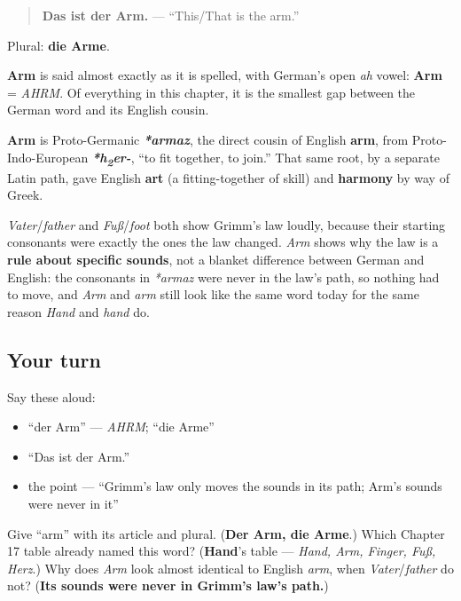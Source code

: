 \begin{quote}
\textbf{Das ist der Arm.} — \textquotedblleft{}This/That is the arm.\textquotedblright{}
\end{quote}

Plural: \textbf{die Arme}.

\begin{sounds}
\textbf{Arm} is said almost exactly as it is spelled, with German's open \emph{ah} vowel: \textbf{Arm} = \emph{AHRM}. Of everything in this chapter, it is the smallest gap between the German word and its English cousin.
\end{sounds}

\begin{cousinweb}
\textbf{Arm} is Proto-Germanic \emph{\textbf{*armaz}}, the direct cousin of English \textbf{arm}, from Proto-Indo-European \emph{\textbf{*h\textsubscript{2}er-}}, \textquotedblleft{}to fit together, to join.\textquotedblright{} That same root, by a separate Latin path, gave English \textbf{art} (a fitting-together of skill) and \textbf{harmony} by way of Greek.

\emph{Vater}/\emph{father} and \emph{Fuß}/\emph{foot} both show Grimm's law loudly, because their starting consonants were exactly the ones the law changed. \emph{Arm} shows why the law is a \textbf{rule about specific sounds}, not a blanket difference between German and English: the consonants in \emph{*armaz} were never in the law's path, so nothing had to move, and \emph{Arm} and \emph{arm} still look like the same word today for the same reason \emph{Hand} and \emph{hand} do.
\end{cousinweb}

\subsection*{Your turn}
Say these aloud:

\begin{itemize}
\raggedright
  \item \textquotedblleft{}der Arm\textquotedblright{} — \emph{AHRM}; \textquotedblleft{}die Arme\textquotedblright{}
  \item \textquotedblleft{}Das ist der Arm.\textquotedblright{}
  \item the point — \textquotedblleft{}Grimm's law only moves the sounds in its path; Arm's sounds were never in it\textquotedblright{}
\end{itemize}

\begin{tcolorbox}[breakable,colback=teal!4,colframe=teal!35!black,title={Before you move on}]
Give \textquotedblleft{}arm\textquotedblright{} with its article and plural. (\textbf{Der Arm, die Arme}.) Which Chapter 17 table already named this word? (\textbf{Hand}'s table — \emph{Hand, Arm, Finger, Fuß, Herz}.) Why does \emph{Arm} look almost identical to English \emph{arm}, when \emph{Vater}/\emph{father} do not? (\textbf{Its sounds were never in Grimm's law's path.})
\end{tcolorbox}
